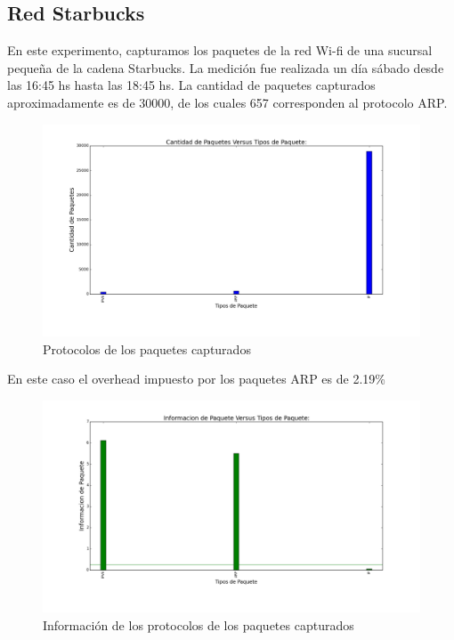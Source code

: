 \subsection{Red Starbucks}

En este experimento, capturamos los paquetes de la red Wi-fi de una sucursal pequeña de la cadena Starbucks. La medición fue realizada un día sábado desde las 16:45 hs hasta las 18:45 hs. La cantidad de paquetes capturados aproximadamente es de 30000, de los cuales 657 corresponden al protocolo ARP.

\begin{figure}[H]
       \centering
       \includegraphics[width=1\textwidth]{../resultados/Starbucks/histogram_types.png}
       \caption{Protocolos de los paquetes capturados}
       \label{red-Starbucks-types}
\end{figure}

En este caso el overhead impuesto por los paquetes ARP es de 2.19\%

\begin{figure}[H]
       \centering
       \includegraphics[width=1\textwidth]{../resultados/Starbucks/histogram_types_information.png}
       \caption{Información de los protocolos de los paquetes capturados}
       \label{red-Starbucks-types-information}
\end{figure}

